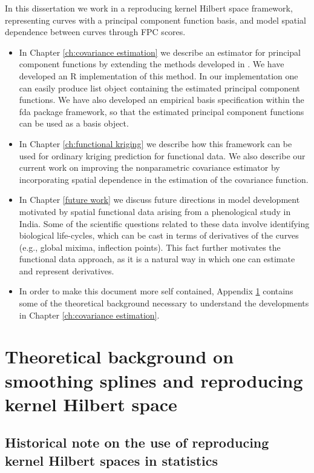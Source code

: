 In this dissertation we work in a reproducing kernel Hilbert space framework, representing curves with a principal component function basis, and model spatial dependence between curves through FPC scores.  
\begin{itemize}
\item In Chapter \ref{ch:covariance estimation} we describe an estimator for principal component functions by extending the methods developed in \cite{Cai:2010vr}. We have developed an R implementation of this method. In our implementation one can easily produce list object containing the estimated principal component functions. We have also developed an empirical basis specification  within the fda package framework, so that the estimated principal component functions can be used as a basis object.  %
\item In Chapter \ref{ch:functional kriging} we describe how this framework can be used for ordinary kriging prediction for functional data. We also describe our current work on improving the nonparametric covariance estimator by incorporating spatial dependence in the estimation of the covariance function. 
\item  In Chapter \ref{future work} we discuss future directions in model development motivated by spatial functional data arising from a phenological study in India. Some of the scientific questions related to these data involve identifying biological life-cycles, which can be cast in terms of derivatives of the curves (e.g., global mixima, inflection points). This fact further motivates the functional data approach, as it is a natural way in which one can estimate and represent derivatives. 
\item In order to make this document more self contained, Appendix \ref{ch:theoretical background} contains some of the theoretical background necessary to understand the developments in Chapter \ref{ch:covariance estimation}. 
\end{itemize}


\section{Theoretical background on smoothing splines and reproducing kernel Hilbert space}
 \label{ch:theoretical background}


\subsection{Historical note on the use of reproducing kernel Hilbert spaces in statistics}

